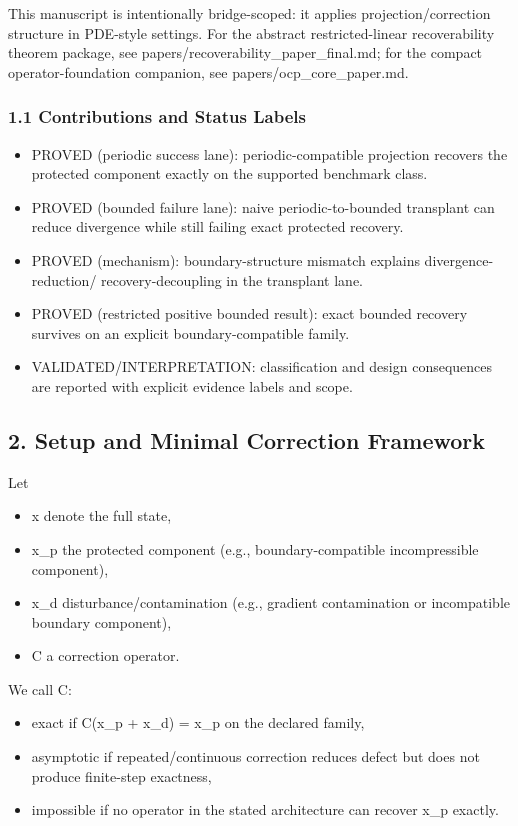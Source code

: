 \documentclass[11pt]{article}
\begin{document}
This manuscript is intentionally bridge-scoped: it applies projection/correction structure in PDE-style settings. For the abstract restricted-linear recoverability theorem package, see papers/recoverability\_paper\_final.md; for the compact operator-foundation companion, see papers/ocp\_core\_paper.md.


\subsubsection*{1.1 Contributions and Status Labels}
\begin{itemize}
\item PROVED (periodic success lane): periodic-compatible projection recovers the protected component exactly on the supported benchmark class.
\item PROVED (bounded failure lane): naive periodic-to-bounded transplant can reduce divergence while still failing exact protected recovery.
\item PROVED (mechanism): boundary-structure mismatch explains divergence-reduction/ recovery-decoupling in the transplant lane.
\item PROVED (restricted positive bounded result): exact bounded recovery survives on an explicit boundary-compatible family.
\item VALIDATED/INTERPRETATION: classification and design consequences are reported with explicit evidence labels and scope.
\end{itemize}

\subsection*{2. Setup and Minimal Correction Framework}
Let

\begin{itemize}
\item x denote the full state,
\item x\_p the protected component (e.g., boundary-compatible incompressible component),
\item x\_d disturbance/contamination (e.g., gradient contamination or incompatible boundary component),
\item C a correction operator.
\end{itemize}

We call C:

\begin{itemize}
\item exact if C(x\_p + x\_d) = x\_p on the declared family,
\item asymptotic if repeated/continuous correction reduces defect but does not produce finite-step exactness,
\item impossible if no operator in the stated architecture can recover x\_p exactly.
\end{itemize}
\end{document}
